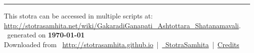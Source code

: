 \documentclass[a5paper,twoside,12pt]{book}
\begin{document}
\setmainfont[Script=Devanagari,Mapping=tex-text]{Sanskrit 2003}
\fontsize {16}{19.25}\selectfont
\let\head\chapt
\begin{center}

\end{center}
\vfill
\centering
\rule{0.8\textwidth}{0.6pt}

\footnotesize
{}\sffamily
This stotra can be accessed in multiple scripts at:\\
\url{http://stotrasamhita.net/wiki/GakaradiGanapati_Ashtottara_Shatanamavali}.\\[1ex]
\faFilePdfO~generated on \textbf{\today}\\[1ex]
Downloaded from \faGlobe{}~\url{http://stotrasamhita.github.io}~|~\href{https://github.com/StotraSamhita}{\faGithubSquare{}~StotraSamhita}~|~\href{https://stotrasamhita.github.io/about/}{Credits}
\end{document}
